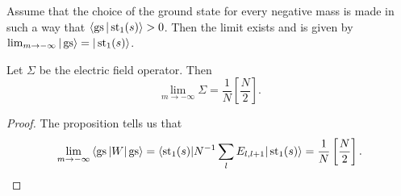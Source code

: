 \begin{proposition}
Assume that the choice of the ground state for every negative mass is made in such a way that $\langle \operatorname{gs} | \operatorname{st}_1(s)\rangle > 0$. Then the limit exists and is given by $\lim_{m \rightarrow -\infty} |\operatorname{gs}\rangle = |\operatorname{st}_1(s)\rangle$.
\end{proposition}
\begin{corp}
Let $\Sigma$ be the electric field operator. Then
\[
\lim_{m \rightarrow -\infty} \Sigma = \frac{1}{N}\left[\frac{N}{2}\right].
\]
\end{corp}
\begin{proof}
The proposition tells us that
\[
\lim_{m \rightarrow -\infty} \left\langle \operatorname{gs} |W|\operatorname{gs} \right\rangle = \langle \operatorname{st}_1(s) |N^{-1}\sum_l E_{l,l+1} | \operatorname{st}_1(s)\rangle = \frac{1}{N}\left[\frac{N}{2}\right].\qedhere
\]
\end{proof}
